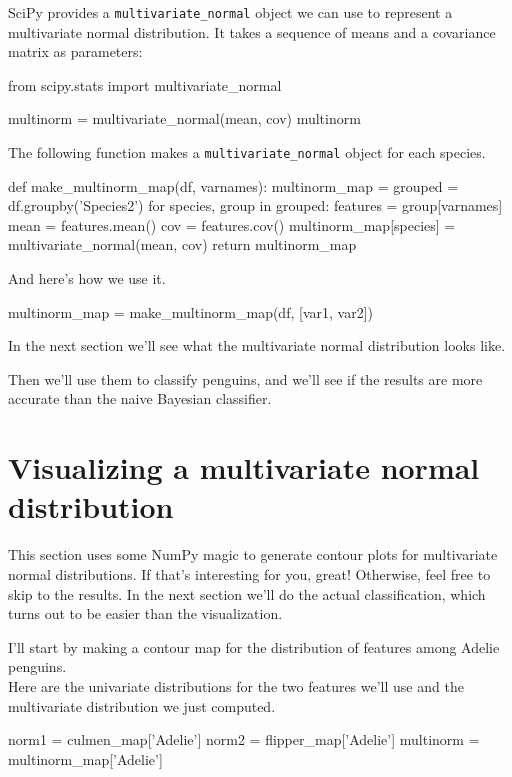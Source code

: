 \documentclass[12pt]{book}
\theoremstyle{exercise}
\newcommand{\py}[1]{{\tt #1}}%
\begin{document}
SciPy provides a \py{multivariate_normal} object
we can use to represent a multivariate normal distribution. It takes a
sequence of means and a covariance matrix as parameters:

\begin{code}
from scipy.stats import multivariate_normal

multinorm = multivariate_normal(mean, cov)
multinorm
\end{code}

The following function makes a
\py{multivariate_normal} object for each species.

\begin{code}
def make_multinorm_map(df, varnames):
    multinorm_map = {}
    grouped = df.groupby('Species2')
    for species, group in grouped:
        features = group[varnames]
        mean = features.mean()
        cov = features.cov()
        multinorm_map[species] = multivariate_normal(mean, cov)
    return multinorm_map
\end{code}

And here's how we use it.

\begin{code}
multinorm_map = make_multinorm_map(df, [var1, var2])
\end{code}

In the next section we'll see what the multivariate normal distribution
looks like.

Then we'll use them to classify penguins, and we'll see if the results
are more accurate than the naive Bayesian classifier.


\section{Visualizing a multivariate normal distribution}
\label{visualizing-a-multivariate-normal-distribution}

This section uses some NumPy magic to generate contour plots for
multivariate normal distributions. If that's interesting for you, great!
Otherwise, feel free to skip to the results. In the next section we'll
do the actual classification, which turns out to be easier than the
visualization.

I'll start by making a contour map for the distribution of features
among Adelie penguins.\\
Here are the univariate distributions for the two features we'll use and
the multivariate distribution we just computed.

\begin{code}
norm1 = culmen_map['Adelie']
norm2 = flipper_map['Adelie']
multinorm = multinorm_map['Adelie']
\end{code}
\end{document}
